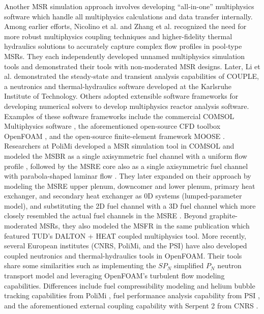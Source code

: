 Another \gls{MSR} simulation approach involves developing ``all-in-one''
multiphysics software which handle all multiphysics calculations and data
transfer internally. Among earlier efforts, Nicolino et al.
\cite{nicolino_coupled_2008} and Zhang et al. \cite{zhang_development_2009}
recognized the
need for more robust multiphysics coupling techniques and higher-fidelity
thermal hydraulics solutions to accurately capture complex flow profiles in
pool-type \glspl{MSR}. They each independently developed unnamed multiphysics
simulation tools and demonstrated their tools with non-moderated \gls{MSR}
designs. Later, Li et al. \cite{li_transient_2015} demonstrated the
steady-state and transient analysis capabilities of COUPLE, a neutronics and
thermal-hydraulics software developed at the Karlsruhe Institute of Technology.
Others adopted extensible software frameworks for developing numerical solvers
to develop multiphysics reactor analysis software. Examples of these software
frameworks include the commercial COMSOL Multiphysics software
\cite{comsol_ab_comsol_2018}, the aforementioned open-source CFD toolbox
OpenFOAM \cite{openfoam_openfoam_2021}, and the open-source finite-element
framework \gls{MOOSE} \cite{gaston_physics-based_2015}. Researchers at
\gls{PoliMi} developed a \gls{MSR} simulation tool in COMSOL and
modeled the \gls{MSBR} as a single axisymmetric fuel channel with a uniform
flow profile \cite{cammi_multi-physics_2011}, followed by the \gls{MSRE} core
also as a single axisymmetric fuel channel with parabola-shaped laminar flow
\cite{cammi_dimensional_2012}. They later expanded on their approach by
modeling the \gls{MSRE} upper plenum, downcomer and lower plenum, primary heat
exchanger, and secondary heat exchanger as 0D systems (lumped-parameter model),
and substituting the 2D fuel channel with a 3D fuel channel which more closely
resembled the actual fuel channels in the \gls{MSRE}
\cite{zanetti_geometric_2015}. Beyond graphite-moderated \glspl{MSR}, they
also modeled the \gls{MSFR} in the same publication which featured \gls{TUD}'s
DALTON + HEAT coupled multiphysics tool.
More recently, several European institutes (\gls{CNRS}, \gls{PoliMi},
and the \gls{PSI}) have also developed coupled neutronics and
thermal-hydraulics tools in OpenFOAM. Their tools share some
similarities such as implementing the $SP_N$ simplified $P_N$ neutron transport
model and leveraging OpenFOAM's turbulent flow modeling capabilities.
Differences include fuel compressibility modeling and helium bubble tracking
capabilities from \gls{PoliMi} \cite{cervi_development_2019}, fuel
performance analysis capability from \gls{PSI} \cite{fiorina_creation_2018},
and the aforementioned external coupling capability with Serpent 2 from
\gls{CNRS} \cite{blanco_neutronic_2020}.

